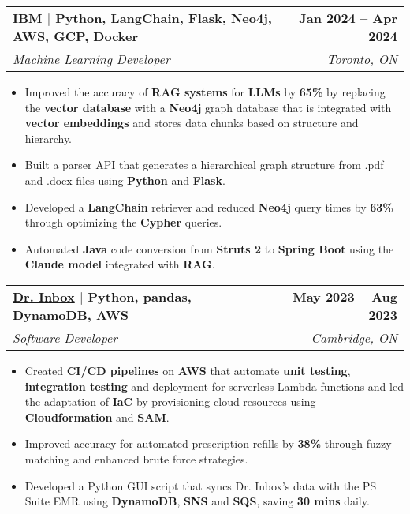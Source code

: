\documentclass[letterpaper,11pt]{article}
\makeatletter
\newcommand{\resumeItem}[1]{
  \item\small{
    {#1 \vspace{-2pt}}
  }
}
\newcommand{\resumeSubheading}[4]{
  \vspace{-2pt}\item
    \begin{tabular*}{1.0\textwidth}[t]{l@{\extracolsep{\fill}}r}
      \textbf{#1} & \textbf{\small #2} \\
      \textit{\small#3} & \textit{\small #4} \\
    \end{tabular*}\vspace{-7pt}
}
\newcommand{\resumeItemListStart}{\begin{itemize}[leftmargin=0.2in]}
\newcommand{\resumeItemListEnd}{\end{itemize}\vspace{-5pt}}
\makeatother
\begin{document}

    \resumeSubheading
      {{\href{https://www.ibm.com/ca-en}{\textcolor{NavyBlue}{IBM}}} $|$ \textnormal{Python, LangChain, Flask, Neo4j, AWS, GCP, Docker}}{Jan 2024 -- Apr 2024}
      {Machine Learning Developer}{Toronto, ON}
      \resumeItemListStart
        \resumeItem{Improved the accuracy of \textbf{RAG systems} for \textbf{LLMs} by \textbf{65\%} by replacing the \textbf{vector database} with a \textbf{Neo4j} graph database that is integrated with \textbf{vector embeddings} and stores data chunks based on structure and hierarchy.}
        \resumeItem{Built a parser API that generates a hierarchical graph structure from .pdf and .docx files using \textbf{Python} and \textbf{Flask}.}
        \resumeItem{Developed a \textbf{LangChain} retriever and reduced \textbf{Neo4j} query times by \textbf{63\%} through optimizing the \textbf{Cypher} queries.}
        \resumeItem{Automated \textbf{Java} code conversion from \textbf{Struts 2} to \textbf{Spring Boot} using the \textbf{Claude model} integrated with \textbf{RAG}.}
      \resumeItemListEnd

    \resumeSubheading
      {{\href{https://www.drinbox.ca/}{\textcolor{NavyBlue}{Dr. Inbox}}} $|$ \textnormal{Python, pandas, DynamoDB, AWS}}{May 2023 -- Aug 2023}
      {Software Developer}{Cambridge, ON}
      \resumeItemListStart
        \resumeItem{Created \textbf{CI/CD pipelines} on \textbf{AWS} that automate \textbf{unit testing}, \textbf{integration testing} and deployment for serverless Lambda functions and led the adaptation of \textbf{IaC} by provisioning cloud resources using \textbf{Cloudformation} and \textbf{SAM}.}
        \resumeItem{Improved accuracy for automated prescription refills by \textbf{38\%} through fuzzy matching and enhanced brute force strategies.} 
        \resumeItem{Developed a Python GUI script that syncs Dr. Inbox's data with the PS Suite EMR using \textbf{DynamoDB}, \textbf{SNS} and \textbf{SQS}, saving \textbf{30 mins} daily.}
      \resumeItemListEnd
\end{document}

